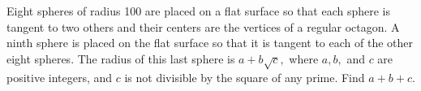 Eight spheres of radius 100 are placed on a flat surface so that each sphere is tangent to two others and their centers are the vertices of a regular octagon.  A ninth sphere is placed on the flat surface so that it is tangent to each of the other eight spheres.  The radius of this last sphere is $a+b\sqrt{c},$ where $a, b,$ and $c$ are positive integers, and $c$ is not divisible by the square of any prime.  Find $a+b+c.$
